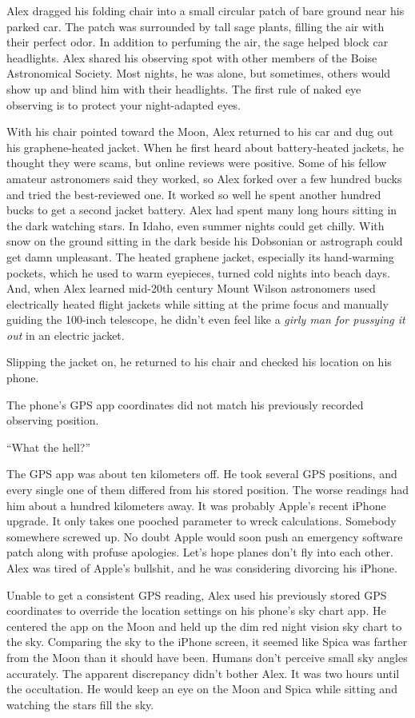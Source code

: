 Alex dragged his folding chair into a small circular patch of bare
ground near his parked car. The patch was surrounded by tall sage
plants, filling the air with their perfect odor. In addition to
perfuming the air, the sage helped block car headlights. Alex shared his
observing spot with other members of the Boise Astronomical Society.
Most nights, he was alone, but sometimes, others would show up and blind
him with their headlights. The first rule of naked eye observing is to
protect your night-adapted eyes.

With his chair pointed toward the Moon, Alex returned to his car and dug
out his graphene-heated jacket. When he first heard about battery-heated
jackets, he thought they were scams, but online reviews were positive.
Some of his fellow amateur astronomers said they worked, so Alex forked
over a few hundred bucks and tried the best-reviewed one. It worked so
well he spent another hundred bucks to get a second jacket battery. Alex
had spent many long hours sitting in the dark watching stars. In Idaho,
even summer nights could get chilly. With snow on the ground sitting in
the dark beside his Dobsonian or astrograph could get damn unpleasant.
The heated graphene jacket, especially its hand-warming pockets, which
he used to warm eyepieces, turned cold nights into beach days. And, when
Alex learned mid-20th century Mount Wilson astronomers used electrically
heated flight jackets while sitting at the prime focus and manually
guiding the 100-inch telescope, he didn't even feel like a \emph{girly
man for pussying it out} in an electric jacket.

Slipping the jacket on, he returned to his chair and checked his
location on his phone.

The phone's GPS app coordinates did not match his previously recorded
observing position.

``What the hell?''

The GPS app was about ten kilometers off. He took several GPS positions,
and every single one of them differed from his stored position. The
worse readings had him about a hundred kilometers away. It was probably
Apple's recent iPhone upgrade. It only takes one pooched parameter to
wreck calculations. Somebody somewhere screwed up. No doubt Apple would
soon push an emergency software patch along with profuse apologies.
Let's hope planes don't fly into each other. Alex was tired of Apple's
bullshit\emph{,} and he was considering divorcing his iPhone.

Unable to get a consistent GPS reading, Alex used his previously stored
GPS coordinates to override the location settings on his phone's sky
chart app. He centered the app on the Moon and held up the dim red night
vision sky chart to the sky. Comparing the sky to the iPhone screen, it
seemed like Spica was farther from the Moon than it should have been.
Humans don't perceive small sky angles accurately. The apparent
discrepancy didn't bother Alex. It was two hours until the occultation.
He would keep an eye on the Moon and Spica while sitting and watching
the stars fill the sky.

